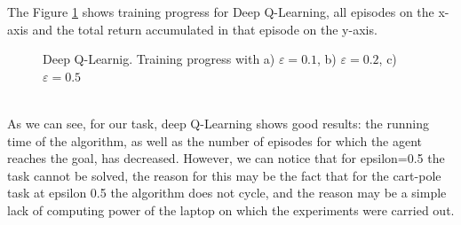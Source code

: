 \documentclass[a4paper, twoside, english]{article}
\begin{document}
The Figure \ref{fig:deepQ} shows training progress for Deep Q-Learning, all episodes on the x-axis and the total return accumulated in that episode on the y-axis.\\

\begin{figure}[h!]
	\centerline
	{
		\quad
		\quad
	}
	\caption[null]{Deep Q-Learnig. Training progress with a) $\varepsilon= 0.1$, b) $\varepsilon= 0.2$, c) $\varepsilon= 0.5$}
	\label{fig:deepQ}
\end{figure}
~\\
As we can see, for our task, deep Q-Learning shows good results: the running time of the algorithm, as well as the number of episodes for which the agent reaches the goal, has decreased. However, we can notice that for epsilon=0.5 the task cannot be solved, the reason for this may be the fact that for the cart-pole task at epsilon 0.5 the algorithm does not cycle, and the reason may be a simple lack of computing power of the laptop on which the experiments were carried out.\\



\end{document}
